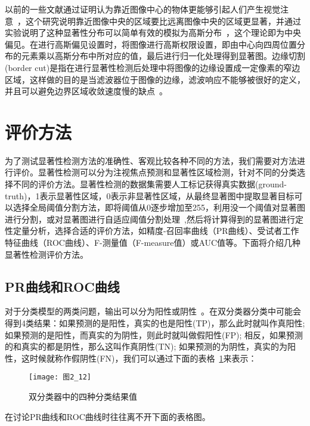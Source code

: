 以前的一些文献通过证明认为靠近图像中心的物体更能够引起人们产生视觉注意~\cite{JuddICCV2009Learning}，这个研究说明靠近图像中央的区域要比远离图像中央的区域更显著，并通过实验说明了这种显著性分布可以简单有效的模拟为高斯分布~\cite{ZhangLin2013SDSP}，这个理论即为中央偏见。在进行高斯偏见设置时，将图像进行高斯权限设置，即由中心向四周位置分布的元素乘以高斯分布中所对应的值，最后进行归一化处理得到显著图。边缘切割(border cut)是指在进行显著性检测后处理中将图像的边缘设置成一定像素的窄边区域，这样做的目的是当滤波器位于图像的边缘，滤波响应不能够被很好的定义，并且可以避免边界区域收敛速度慢的缺点~\cite{ChengMingMingCVPR2011Global}。

\section{评价方法}
\label{2_5}

为了测试显著性检测方法的准确性、客观比较各种不同的方法，我们需要对方法进行评价。显著性检测可以分为注视焦点预测和显著性区域检测\cite{LiYinCVPR2014Secrets}，针对不同的分类选择不同的评价方法。显著性检测的数据集需要人工标记获得真实数据(ground-truth)，1表示显著性区域，0表示非显著性区域，从最终显著图中提取显著目标可以选择全局阈值分割方法，即将阈值从0逐步增加至255，利用没一个阈值对显著图进行分割，或对显著图进行自适应阈值分割处理~\cite{AchantaCVPR2009Frequency},然后将计算得到的显著图进行定性定量分析，选择合适的评价方法，如精度-召回率曲线（PR曲线）、受试者工作特征曲线（ROC曲线）、F-测量值（F-measure值）或AUC值等。下面将介绍几种显著性检测评价方法。

\subsection{PR曲线和ROC曲线}
\label{2_5_1}

对于分类模型的两类问题，输出可以分为阳性或阴性~\cite{Powers2007Evaluation}。在双分类器分类中可能会得到4类结果：如果预测的是阳性，真实的也是阳性(TP)，那么此时就叫作真阳性; 如果预测的是阳性，而真实的为阴性，则此时就叫做假阳性(FP); 相反，如果预测的和真实的都是阴性，那么这叫作真阴性(TN); 如果预测的为阴性，真实的为阳性，这时候就称作假阴性(FN)，我们可以通过下面的表格~\ref{图2_12}来表示：
\begin{figure}[h] %
  \centering
  \texttt{[image: 图2\_12]}
  \caption{双分类器中的四种分类结果值}
  \label{图2_12}
\end{figure}
在讨论PR曲线和ROC曲线时往往离不开下面的表格图。

